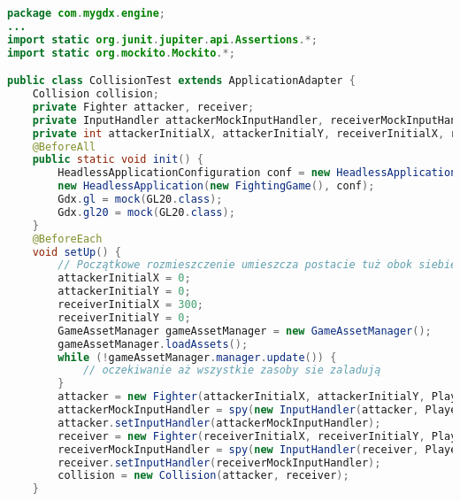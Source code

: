 \begin{lstlisting}[language=Java,style=JavaStyle,label=list:CollisionTest,caption=Test poprawnego wykrywania kolizji w klasie \texttt{Collision},
                   basicstyle=\footnotesize\ttfamily]
package com.mygdx.engine;
...
import static org.junit.jupiter.api.Assertions.*;
import static org.mockito.Mockito.*;

public class CollisionTest extends ApplicationAdapter {
    Collision collision;
    private Fighter attacker, receiver;
    private InputHandler attackerMockInputHandler, receiverMockInputHandler;
    private int attackerInitialX, attackerInitialY, receiverInitialX, receiverInitialY;
    @BeforeAll
    public static void init() {
        HeadlessApplicationConfiguration conf = new HeadlessApplicationConfiguration();
        new HeadlessApplication(new FightingGame(), conf);
        Gdx.gl = mock(GL20.class);
        Gdx.gl20 = mock(GL20.class);
    }
    @BeforeEach
    void setUp() {
        // Początkowe rozmieszczenie umieszcza postacie tuż obok siebie
        attackerInitialX = 0;
        attackerInitialY = 0;
        receiverInitialX = 300;
        receiverInitialY = 0;
        GameAssetManager gameAssetManager = new GameAssetManager();
        gameAssetManager.loadAssets();
        while (!gameAssetManager.manager.update()) {
            // oczekiwanie aż wszystkie zasoby sie zaladują
        }
        attacker = new Fighter(attackerInitialX, attackerInitialY, Player.PLAYER1, 0, 0, 0, 0, 10, gameAssetManager.manager);
        attackerMockInputHandler = spy(new InputHandler(attacker, Player.PLAYER1, 0, 0, 0, 0, 10));
        attacker.setInputHandler(attackerMockInputHandler);
        receiver = new Fighter(receiverInitialX, receiverInitialY, Player.PLAYER2, 0, 0, 0, 0, 10, gameAssetManager.manager);
        receiverMockInputHandler = spy(new InputHandler(receiver, Player.PLAYER2, 0, 0, 0, 0, 10));
        receiver.setInputHandler(receiverMockInputHandler);
        collision = new Collision(attacker, receiver);
    }


\end{lstlisting}
